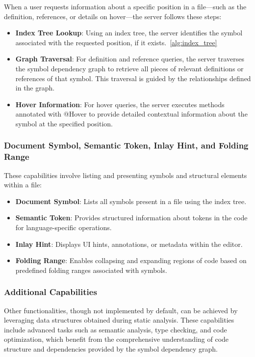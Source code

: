 When a user requests information about a specific position in a file—such as the definition, references, or details on hover—the server follows these steps:

\begin{itemize}
    \item \textbf{Index Tree Lookup}: Using an index tree, the server identifies the symbol associated with the requested position, if it exists.~\ref{alg:index_tree}
    \item \textbf{Graph Traversal}: For definition and reference queries, the server traverses the symbol dependency graph to retrieve all pieces of relevant definitions or references of that symbol. This traversal is guided by the relationships defined in the graph.
    \item \textbf{Hover Information}: For hover queries, the server executes methods annotated with @Hover to provide detailed contextual information about the symbol at the specified position.
\end{itemize}

\subsubsection{Document Symbol, Semantic Token, Inlay Hint, and Folding Range}\label{subsubsec:concept:DocumentSymbolSemanticTokenInlayHintAndFoldingRange}

These capabilities involve listing and presenting symbols and structural elements within a file:

\begin{itemize}
    \item \textbf{Document Symbol}: Lists all symbols present in a file using the index tree.
    \item \textbf{Semantic Token}: Provides structured information about tokens in the code for language-specific operations.
    \item \textbf{Inlay Hint}: Displays UI hints, annotations, or metadata within the editor.
    \item \textbf{Folding Range}: Enables collapsing and expanding regions of code based on predefined folding ranges associated with symbols.
\end{itemize}

\subsubsection{Additional Capabilities}\label{subsubsec:concept:AdditionalCapabilities}
Other functionalities, though not implemented by default, can be achieved by leveraging data structures obtained during static analysis. These capabilities include advanced tasks such as semantic analysis, type checking, and code optimization, which benefit from the comprehensive understanding of code structure and dependencies provided by the symbol dependency graph.

